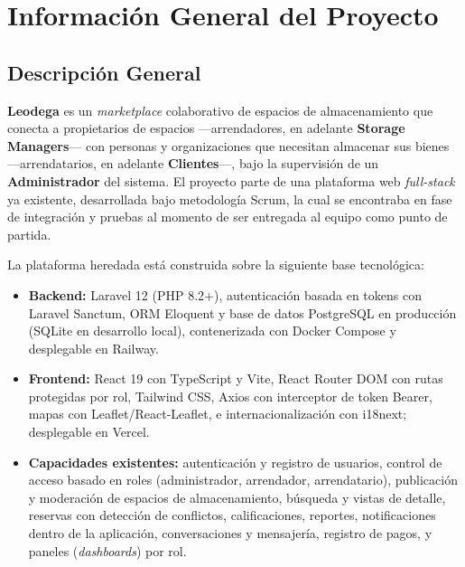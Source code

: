 \chapter{Información General del Proyecto}

\section{Descripción General}

\textbf{Leodega} es un \textit{marketplace} colaborativo de espacios de almacenamiento que conecta a propietarios de espacios ---arrendadores, en adelante \textbf{Storage Managers}--- con personas y organizaciones que necesitan almacenar sus bienes ---arrendatarios, en adelante \textbf{Clientes}---, bajo la supervisión de un \textbf{Administrador} del sistema. El proyecto parte de una plataforma web \textit{full-stack} ya existente, desarrollada bajo metodología Scrum, la cual se encontraba en fase de integración y pruebas al momento de ser entregada al equipo como punto de partida.

La plataforma heredada está construida sobre la siguiente base tecnológica:
\begin{itemize}[leftmargin=*]
    \item \textbf{Backend:} Laravel 12 (PHP 8.2+), autenticación basada en tokens con Laravel Sanctum, ORM Eloquent y base de datos PostgreSQL en producción (SQLite en desarrollo local), contenerizada con Docker Compose y desplegable en Railway.
    \item \textbf{Frontend:} React 19 con TypeScript y Vite, React Router DOM con rutas protegidas por rol, Tailwind CSS, Axios con interceptor de token Bearer, mapas con Leaflet/React-Leaflet, e internacionalización con i18next; desplegable en Vercel.
    \item \textbf{Capacidades existentes:} autenticación y registro de usuarios, control de acceso basado en roles (administrador, arrendador, arrendatario), publicación y moderación de espacios de almacenamiento, búsqueda y vistas de detalle, reservas con detección de conflictos, calificaciones, reportes, notificaciones dentro de la aplicación, conversaciones y mensajería, registro de pagos, y paneles (\textit{dashboards}) por rol.
\end{itemize}

